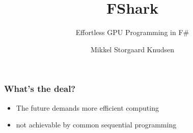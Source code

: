 \documentclass[10pt, compress]{beamer}
\title{FShark}
\subtitle{Effortless GPU Programming in F\#}
\author{Mikkel Storgaard Knudsen}
\institute{Master's Thesis presentation, University of Copenhagen}
\begin{document}
\maketitle

\begin{frame}[fragile]
\frametitle{What's the deal?}
\pause
\begin{itemize}
\item<+-> The future demands more efficient computing
\item<+-> not achievable by common sequential programming 
\end{itemize}
\pause 



\end{frame}
\end{document}
